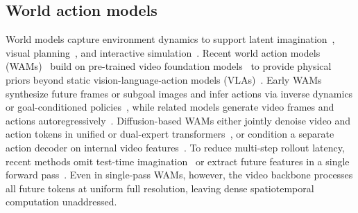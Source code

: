 \subsection{World action models}
\label{sec:related_wam}
    World models capture environment dynamics to support latent imagination~\cite{ha2018worldmodels,hafner2020dreamer,hafner2023dreamerv3}, visual planning~\cite{finn2017foresight,zhou2024dinowm,assran2025vjepa2}, and interactive simulation~\cite{yang2024unisim,bruce2024genie,jang2025dreamgen}.
    Recent world action models (WAMs)~\cite{pai2025mimicvideo,ye2026dreamzero} build on pre-trained video foundation models~\cite{nvidia2025cosmos,wan2025wan} to provide physical priors beyond static vision-language-action models (VLAs)~\cite{brohan2023rt1,brohan2023rt2,kim2024openvla,black2025pi0}.
    Early WAMs synthesize future frames or subgoal images and infer actions via inverse dynamics or goal-conditioned policies~\cite{du2023unipi,ko2024avdc,black2024susie,tian2024seer,zhao2025cotvla}, while related models generate video frames and actions autoregressively~\cite{wu2024gr1,cheang2024gr2}.
    Diffusion-based WAMs either jointly denoise video and action tokens in unified or dual-expert transformers~\cite{guo2024pad,li2025uva,zhu2025uwm,kim2026cosmospolicy,ye2026dreamzero,bi2026motus,li2026lingbotva}, or condition a separate action decoder on internal video features~\cite{wen2024vidman,hu2025vpp,liao2025ge,pai2025mimicvideo,ma2026dit4dit,zhang2026deva}.
    To reduce multi-step rollout latency, recent methods omit test-time imagination~\cite{zheng2025flare,yuan2026fastwam} or extract future features in a single forward pass~\cite{pai2025mimicvideo,ma2026dit4dit,zhang2026rift}.
    Even in single-pass WAMs, however, the video backbone processes all future tokens at uniform full resolution, leaving dense spatiotemporal computation unaddressed.


